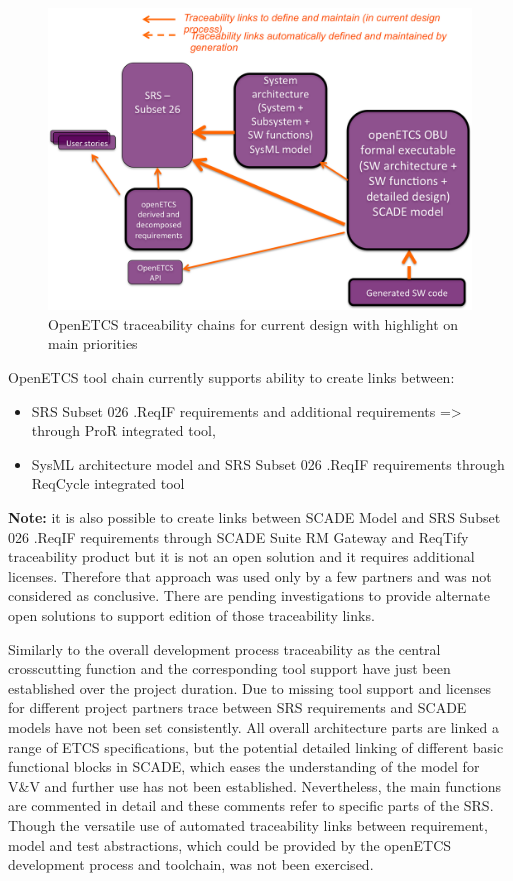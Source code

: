 \documentclass{template/openetcs_report}
\begin{document}
\begin{figure}[htbp]
\centering
\includegraphics[width=.9\linewidth]
{./images/openETCSTraceabilityMainPriority.png}
\caption{\label{fig:openETCSTraceabilityMainPriority}OpenETCS traceability chains for current design with highlight on main priorities}
\end{figure}

OpenETCS tool chain currently supports ability to create links between:
\begin{itemize}
\item SRS Subset 026 .ReqIF requirements and additional requirements => through ProR integrated tool,
\item SysML architecture model and SRS Subset 026 .ReqIF requirements through ReqCycle integrated tool
\end{itemize}
 
\textbf{Note:} it is also possible to create links between SCADE Model and SRS Subset 026 .ReqIF requirements through SCADE Suite RM Gateway and ReqTify traceability product but it is not an open solution and it requires additional licenses. Therefore that approach was used only by a few partners and was not considered as conclusive. There are pending investigations to provide alternate open solutions to support edition of those traceability links.

Similarly to the overall development process traceability as the central crosscutting function and the corresponding tool support have just been established over the project duration. Due to missing tool support and licenses for different project partners trace between SRS requirements and SCADE models have not been set consistently. All overall architecture parts are linked a range of ETCS specifications, but the potential detailed linking of different basic functional blocks in SCADE, which eases the understanding of the model for V\&V and further use has not been established. Nevertheless, the main functions are commented in detail and these comments refer to specific parts of the SRS. Though the versatile use of automated traceability links between requirement, model and test abstractions, which could be provided by the openETCS development process and toolchain, was not been exercised.   
\end{document}
